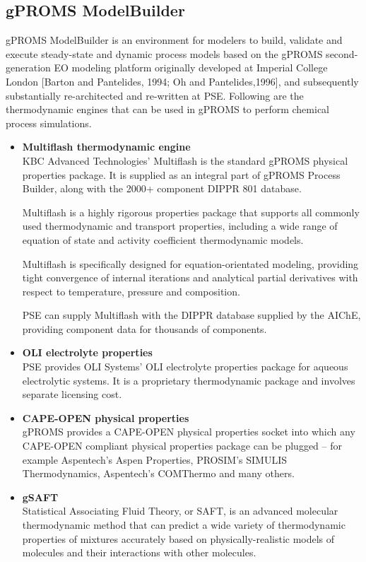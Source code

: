 \documentclass[12pt]{report}
\begin{document}
\subsection{gPROMS ModelBuilder}
gPROMS ModelBuilder is an environment for modelers to build, validate and execute steady-state and dynamic process models based on the gPROMS second-generation EO modeling platform originally developed at Imperial College London [Barton and Pantelides, 1994; Oh and Pantelides,1996], and subsequently substantially re-architected and re-written at PSE. Following are the thermodynamic engines that can be used in gPROMS to perform chemical process simulations. \cite{GP}
\begin{itemize}
\item \textbf{Multiflash thermodynamic engine} \\
KBC Advanced Technologies' Multiflash is the standard gPROMS physical properties package. It is supplied as an integral part of gPROMS Process Builder, along with the 2000+ component DIPPR 801 database.

Multiflash is a highly rigorous properties package that supports all commonly used thermodynamic and transport properties, including a wide range of equation of state and activity coefficient thermodynamic models.

Multiflash is specifically designed for equation-orientated modeling, providing tight convergence of internal iterations and analytical partial derivatives with respect to temperature, pressure and composition.

PSE can supply Multiflash with the DIPPR database supplied by the AIChE, providing component data for thousands of components.

\item \textbf{OLI electrolyte properties} \\
PSE provides OLI Systems' OLI electrolyte properties package for aqueous electrolytic systems. It is a proprietary thermodynamic package and involves separate licensing cost.

\item \textbf{CAPE-OPEN physical properties} \\
gPROMS provides a CAPE-OPEN physical properties socket into which any CAPE-OPEN compliant physical properties package can be plugged – for example Aspentech's Aspen Properties, PROSIM's SIMULIS Thermodynamics, Aspentech's COMThermo and many others.

\item \textbf{gSAFT} \\
Statistical Associating Fluid Theory, or SAFT, is an advanced molecular thermodynamic method that can predict a wide variety of thermodynamic properties of mixtures accurately based on physically-realistic models of molecules and their interactions with other molecules.
\end{itemize}
\end{document}
